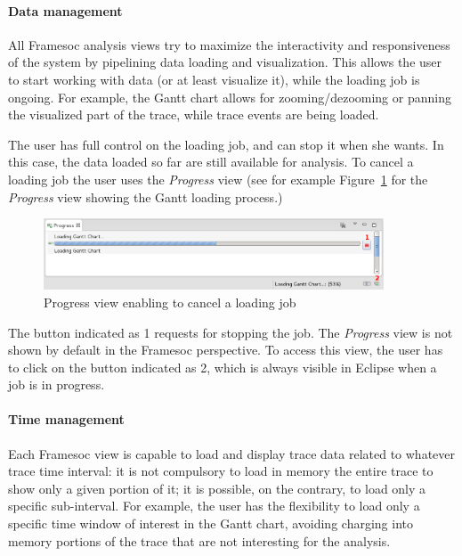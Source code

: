 \documentclass[twoside]{article}
\begin{document}
\begin{sloppypar}
\paragraph{Data management} 

All Framesoc analysis views try to maximize the interactivity and responsiveness of the system by pipelining data loading and visualization. This allows the user to start working with data (or at least visualize it), while the loading job is ongoing. For example, the Gantt chart allows for zooming/dezooming or panning the visualized part of the trace, while trace events are being loaded. 

The user has full control on the loading job, and can stop it when she wants. In this case, the data loaded so far are still available for analysis. To cancel a loading job the user uses the \emph{Progress} view (see for example Figure~\ref{fig:progress} for the \emph{Progress} view showing the Gantt loading process.)

\begin{figure}[h!]
  \centering
    \includegraphics[width=0.9\textwidth]{images/loading.png}
  \caption{Progress view enabling to cancel a loading job}
  \label{fig:progress}
\end{figure}

The button indicated as \num{1} requests for stopping the job. The \emph{Progress} view is not shown by default in the Framesoc perspective. To access this view, the user has to click on the button indicated as \num{2}, which is always visible in Eclipse when a job is in progress.

\paragraph{Time management} Each Framesoc view is capable to load and display trace data related to whatever trace time interval: it is not compulsory to load in memory the entire trace to show only a given portion of it; it is possible, on the contrary, to load only a specific sub-interval. For example, the user has the flexibility to load only a specific time window of interest in the Gantt chart, avoiding charging into memory portions of the trace that are not interesting for the analysis.


\end{sloppypar}
\end{document}
